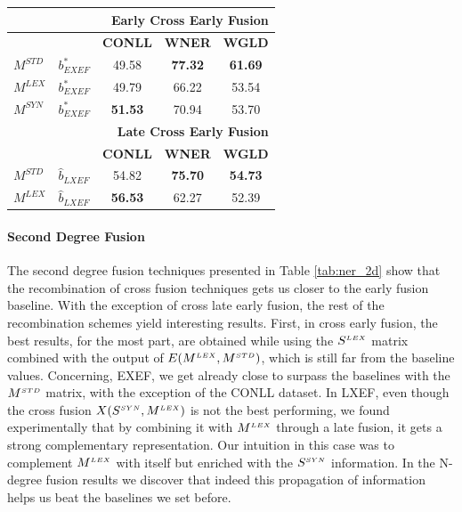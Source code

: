\begin{table}[t]
\begin{tabular}{@{}llccc@{}}
	                         &                & \multicolumn{3}{r}{\textbf{Early Cross Early Fusion}} \\ \midrule
	                         &                & \textbf{CONLL} & \textbf{WNER}  &             \textbf{WGLD}             \\
	\cmidrule{3-5}
$M^{\scriptscriptstyle STD}$ & $b^*_{\scriptscriptstyle EXEF}$          & 49.58 & \textbf{77.32} &            \textbf{61.69}             \\
	$M^{\scriptscriptstyle LEX}$                & $b^*_{\scriptscriptstyle EXEF}$      & 49.79 & 66.22 &            53.54             \\
	$M^{\scriptscriptstyle SYN}$                & $b^*_{\scriptscriptstyle EXEF}$           & \textbf{51.53} & 70.94 &            53.70             \\ \midrule
	                         &                & \multicolumn{3}{r}{\textbf{Late Cross Early Fusion}}  \\ \midrule
	                         &                & \textbf{CONLL} & \textbf{WNER}  &             \textbf{WGLD}             \\
	\cmidrule{3-5}
$M^{\scriptscriptstyle STD}$ &$\hat{b}_{\scriptscriptstyle LXEF}$           &  54.82   & \textbf{75.70} &            \textbf{54.73}             \\
	$M^{\scriptscriptstyle LEX}$                & $\hat{b}_{\scriptscriptstyle LXEF}$  & \textbf{56.53} & 62.27 &            52.39             \\ \bottomrule
\end{tabular}
\end{table}
           
\paragraph{Second Degree Fusion} 
The second degree fusion techniques presented in Table \ref{tab:ner_2d} show that the recombination of cross fusion techniques gets us closer to the early fusion baseline. With the exception of cross late early fusion, the rest of the recombination schemes yield interesting results. First, in cross early fusion, the best results, for the most part, are obtained while using the $S^{\scriptscriptstyle LEX}$ matrix combined with the output of $E(M^{\scriptscriptstyle LEX}, M^{\scriptscriptstyle STD})$, which is still far from the baseline values. Concerning, EXEF, we get already close to surpass the baselines with the $M^{\scriptscriptstyle STD}$ matrix, with the exception of the CONLL dataset. In LXEF, even though the cross fusion $X(S^{\scriptscriptstyle SYN}, M^{\scriptscriptstyle LEX})$ is not the best performing, we found experimentally that by combining it with $M^{\scriptscriptstyle LEX}$ through a late fusion, it gets  a strong complementary representation. Our intuition in this case was to complement $M^{\scriptscriptstyle LEX}$ with itself but enriched with the $S^{\scriptscriptstyle SYN}$ information. In the N-degree fusion results we discover that indeed this propagation of information helps us beat the baselines we set before.
